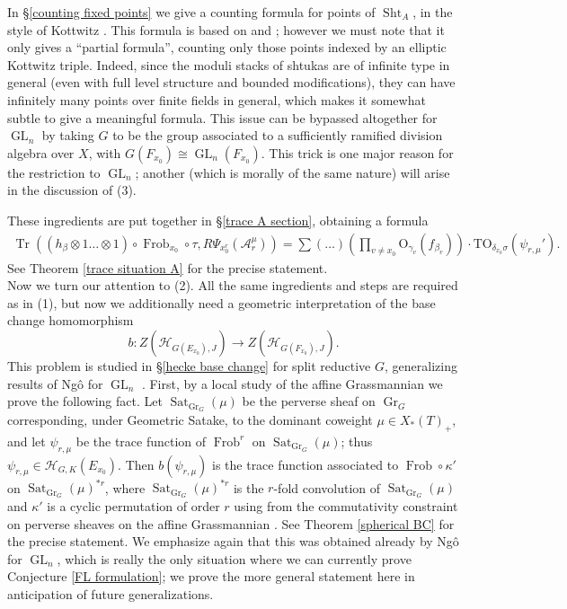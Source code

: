 \documentclass[reqno]{amsart}
\numberwithin{equation}{section}
\newcommand{\Cal}[1]{\mathcal{#1}}
\newcommand{\co}{\colon}
\newcommand{\mrm}[1]{\mathrm{#1}}
\DeclareMathOperator{\GL}{GL}
\DeclareMathOperator{\Frob}{Frob}
\DeclareMathOperator{\Tr}{Tr}
\DeclareMathOperator{\Gr}{Gr}
\DeclareMathOperator{\Sht}{Sht}
\DeclareMathOperator{\Sat}{Sat}
\theoremstyle{remark}
\numberwithin{equation}{section}
\begin{document}
In \S \ref{counting fixed points} we give a counting formula for points of $\Sht_A$, in the style of Kottwitz \cite{Kott92}. This formula is based on \cite{Ngo06} and \cite{NgoNgo}; however we must note that it only gives a ``partial formula'', counting only those points indexed by an elliptic Kottwitz triple. Indeed, since the moduli stacks of shtukas are of infinite type in general (even with full level structure and bounded modifications), they can have infinitely many points over finite fields in general, which makes it somewhat subtle to give a meaningful formula. This issue can be bypassed altogether for $\GL_n$ by taking $G$ to be the group associated to a sufficiently ramified division algebra over $X$, with $G(F_{x_0}) \cong \GL_n(F_{x_0})$. This trick is one major reason for the restriction to $\GL_n$; another (which is morally of the same nature) will arise in the discussion of (3).

These ingredients are put together in \S \ref{trace A section}, obtaining a formula
\begin{align}\label{overview trace A}
\Tr(( h_{\beta} \otimes 1 \ldots \otimes 1 ) \circ \Frob_{x_0} \circ  \tau , R\Psi_{x_0^r}(\Cal{A}_r^{\mu}))  =    \sum 
 (\ldots)  \left( \prod_{v \neq x_0}\mrm{O}_{\gamma_v}(f_{\beta_v})  \right) \cdot  \mrm{TO}_{\delta_{x_0} \sigma}(\psi_{r,\mu}').
\end{align}
See Theorem \ref{trace situation A} for the precise statement. \\


Now we turn our attention to (2). All the same ingredients and steps are required as in (1), but now we additionally need a geometric interpretation of the base change homomorphism 
\[
b \co Z(\Cal{H}_{G(E_{x_0}),J}) \rightarrow Z(\Cal{H}_{G(F_{x_0}),J}).
\]
This problem is studied in \S \ref{hecke base change} for split reductive $G$, generalizing results of Ng\^{o} for $\GL_n$ \cite{Ngo99}. First, by a local study of the affine Grassmannian we prove the following fact. Let $\Sat_{\Gr_G}(\mu)$ be the perverse sheaf on $\Gr_G$ corresponding, under Geometric Satake, to the dominant coweight $\mu  \in X_*(T)_+$, and let $\psi_{r,\mu}$ be the trace function of $\Frob^r$ on $\Sat_{\Gr_G}(\mu)$; thus $\psi_{r,\mu} \in \Cal{H}_{G,K}(E_{x_0})$. Then $b(\psi_{r,\mu})$ is the trace function associated to $\Frob \circ \kappa'$ on $\Sat_{\Gr_G}(\mu)^{*r}$, where $\Sat_{\Gr_G}(\mu)^{*r}$ is the $r$-fold convolution of $\Sat_{\Gr_G}(\mu)$ and $\kappa'$ is a cyclic permutation of order $r$ using from the commutativity constraint on perverse sheaves on the affine Grassmannian \cite{MV07}. See Theorem \ref{spherical BC} for the precise statement. We emphasize again that this was obtained already by Ng\^{o} for $\GL_n$, which is really the only situation where we can currently prove Conjecture \ref{FL formulation}; we prove the more general statement here in anticipation of future generalizations. 
\end{document}
